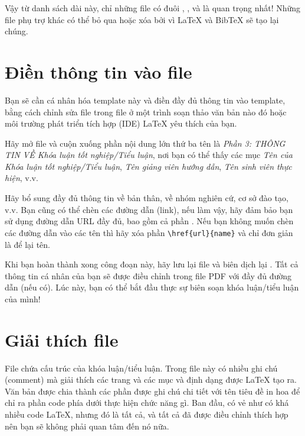 Vậy từ danh sách dài này, chỉ những file có đuôi , ,  và  là quan trọng nhất! Những file phụ trợ khác có thể bỏ qua hoặc xóa bởi vì \LaTeX{} và BibTeX sẽ tạo lại chúng.



\section{Điền thông tin vào file }\label{FillingFile}

Bạn sẽ cần cá nhân hóa template này và điền đầy đủ thông tin vào template, bằng cách chỉnh sửa file  trong file ở một trình soạn thảo văn bản nào đó hoặc môi trường phát triển tích hợp (IDE) \LaTeX{} yêu thích của bạn.

Hãy mở file  và cuộn xuống phần nội dung lớn thứ ba tên là \emph{Phần 3: THÔNG TIN VỀ Khóa luận tốt nghiệp/Tiểu luận}, nơi bạn có thể thấy các mục \emph{Tên của Khóa luận tốt nghiệp/Tiểu luận}, \emph{Tên giảng viên hướng dẫn}, \emph{Tên sinh viên thực hiện}, v.v.

Hãy bổ sung đầy đủ thông tin về bản thân, về nhóm nghiên cứ, cơ sở đào tạo, v.v. Bạn cũng có thể chèn các đường dẫn (link), nếu làm vậy, hãy đảm bảo bạn sử dụng đường dẫn URL đầy đủ, bao gồm cả phần . Nếu bạn không muốn chèn các đường dẫn vào các tên thì hãy xóa phần \verb|\href{url}{name}| và chỉ đơn giản là để lại tên.

Khi bạn hoàn thành xong công đoạn này, hãy lưu lại file và biên dịch lại . Tất cả thông tin cá nhân của bạn sẽ được điều chỉnh trong file PDF với đầy đủ đường dẫn (nếu có). Lúc này, bạn có thể bắt đầu thực sự biên soạn khóa luận/tiểu luận của mình!



\section{Giải thích file }

File  chứa cấu trúc của khóa luận/tiểu luận. Trong file này có nhiều ghi chú (comment) mà giải thích các trang và các mục và định dạng được \LaTeX{} tạo ra. Văn bản được chia thành các phần được ghi chú chi tiết với tên tiêu đề in hoa để chỉ ra phần code phía dưới thực hiện chức năng gì. Ban đầu, có vẻ như có khá nhiều code \LaTeX{}, nhưng đó là tất cả, và tất cả đã được điều chỉnh thích hợp nên bạn sẽ không phải quan tâm đến nó nữa.

